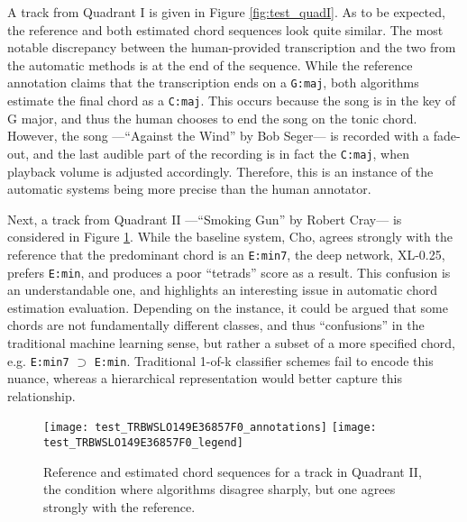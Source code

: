 A track from Quadrant I is given in Figure \ref{fig:test_quadI}.
As to be expected, the reference and both estimated chord sequences look quite similar.
The most notable discrepancy between the human-provided transcription and the two from the automatic methods is at the end of the sequence.
While the reference annotation claims that the transcription ends on a \texttt{G:maj}, both algorithms estimate the final chord as a \texttt{C:maj}.
This occurs because the song is in the key of G major, and thus the human chooses to end the song on the tonic chord.
However, the song ---``Against the Wind'' by Bob Seger--- is recorded with a fade-out, and the last audible part of the recording is in fact the \texttt{C:maj}, when playback volume is adjusted accordingly.
Therefore, this is an instance of the automatic systems being more precise than the human annotator.


Next, a track from Quadrant II ---``Smoking Gun'' by Robert Cray--- is considered in Figure \ref{fig:test_quadII}.
While the baseline system, Cho, agrees strongly with the reference that the predominant chord is an \texttt{E:min7}, the deep network, XL-0.25, prefers \texttt{E:min}, and produces a poor ``tetrads'' score as a result.
This confusion is an understandable one, and highlights an interesting issue in automatic chord estimation evaluation.
Depending on the instance, it could be argued that some chords are not fundamentally different classes, and thus ``confusions'' in the traditional machine learning sense, but rather a subset of a more specified chord, e.g. \texttt{E:min7} $\supset$ \texttt{E:min}.
Traditional 1-of-k classifier schemes fail to encode this nuance, whereas a hierarchical representation would better capture this relationship.

\begin{figure}[t!]
\centering
\texttt{[image: test\_TRBWSLO149E36857F0\_annotations]}
\texttt{[image: test\_TRBWSLO149E36857F0\_legend]}
\caption{Reference and estimated chord sequences for a track in Quadrant II, the condition where algorithms disagree sharply, but one agrees strongly with the reference.}
\label{fig:test_quadII}
\end{figure}


